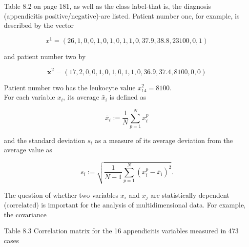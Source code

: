 \documentclass[10pt]{article}
\begin{document}
Table 8.2 on page 181, as well as the class label-that is, the diagnosis (appendicitis positive/negative)-are listed. Patient number one, for example, is described by the vector

$$
x^{1}=(26,1,0,0,1,0,1,0,1,1,0,37.9,38.8,23100,0,1)
$$

and patient number two by

$$
\boldsymbol{x}^{2}=(17,2,0,0,1,0,1,0,1,1,0,36.9,37.4,8100,0,0)
$$

Patient number two has the leukocyte value $x_{14}^{2}=8100$.\\
For each variable $x_{i}$, its average $\bar{x}_{i}$ is defined as

$$
\bar{x}_{i}:=\frac{1}{N} \sum_{p=1}^{N} x_{i}^{p}
$$

and the standard deviation $s_{i}$ as a measure of its average deviation from the average value as

$$
s_{i}:=\sqrt{\frac{1}{N-1} \sum_{p=1}^{N}\left(x_{i}^{p}-\bar{x}_{i}\right)^{2}} .
$$

The question of whether two variables $x_{i}$ and $x_{j}$ are statistically dependent (correlated) is important for the analysis of multidimensional data. For example, the covariance

Table 8.3 Correlation matrix for the 16 appendicitis variables measured in 473 cases
\end{document}
